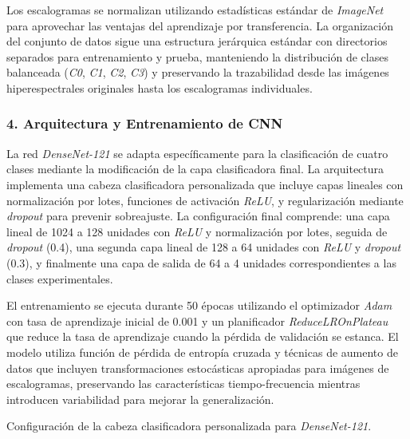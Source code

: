 \vspace{5mm}

Los escalogramas se normalizan utilizando estadísticas estándar de \emph{ImageNet} para aprovechar las ventajas del aprendizaje por transferencia. La organización del conjunto de datos sigue una estructura jerárquica estándar con directorios separados para entrenamiento y prueba, manteniendo la distribución de clases balanceada (\emph{C0}, \emph{C1}, \emph{C2}, \emph{C3}) y preservando la trazabilidad desde las imágenes hiperespectrales originales hasta los escalogramas individuales.

\subsubsection{4. Arquitectura y Entrenamiento de CNN}

La red \emph{DenseNet-121} se adapta específicamente para la clasificación de cuatro clases mediante la modificación de la capa clasificadora final. La arquitectura implementa una cabeza clasificadora personalizada que incluye capas lineales con normalización por lotes, funciones de activación \emph{ReLU}, y regularización mediante \emph{dropout} para prevenir sobreajuste. La configuración final comprende: una capa lineal de 1024 a 128 unidades con \emph{ReLU} y normalización por lotes, seguida de \emph{dropout} (0.4), una segunda capa lineal de 128 a 64 unidades con \emph{ReLU} y \emph{dropout} (0.3), y finalmente una capa de salida de 64 a 4 unidades correspondientes a las clases experimentales.

\vspace{5mm}

El entrenamiento se ejecuta durante 50 épocas utilizando el optimizador \emph{Adam} con tasa de aprendizaje inicial de 0.001 y un planificador \emph{ReduceLROnPlateau} que reduce la tasa de aprendizaje cuando la pérdida de validación se estanca. El modelo utiliza función de pérdida de entropía cruzada y técnicas de aumento de datos que incluyen transformaciones estocásticas apropiadas para imágenes de escalogramas, preservando las características tiempo-frecuencia mientras introducen variabilidad para mejorar la generalización.

\begin{table}[ht]
\centering
\caption{Configuración de la cabeza clasificadora personalizada para \emph{DenseNet-121}.}
\label{tab:custom_layers}
\end{table}

